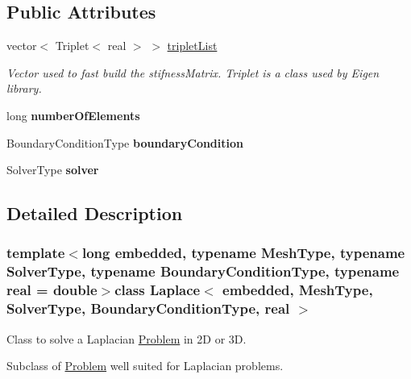 \subsection*{\-Public \-Attributes}
\begin{DoxyCompactItemize}
\item 
\hypertarget{class_laplace_a3c7f5f7a6eaca88b6cbfee3afdfe4c07}{vector$<$ \-Triplet$<$ real $>$ $>$ \hyperlink{class_laplace_a3c7f5f7a6eaca88b6cbfee3afdfe4c07}{triplet\-List}}\label{class_laplace_a3c7f5f7a6eaca88b6cbfee3afdfe4c07}

\begin{DoxyCompactList}\small\item\em \-Vector used to fast build the stifness\-Matrix. \-Triplet is a class used by \-Eigen library. \end{DoxyCompactList}\item 
\hypertarget{class_laplace_a0654b60f9552d97136a11ea7836e219b}{long {\bfseries number\-Of\-Elements}}\label{class_laplace_a0654b60f9552d97136a11ea7836e219b}

\item 
\hypertarget{class_laplace_a5e83c7cde7aa4051caf619d41b9642c0}{\-Boundary\-Condition\-Type {\bfseries boundary\-Condition}}\label{class_laplace_a5e83c7cde7aa4051caf619d41b9642c0}

\item 
\hypertarget{class_laplace_a288665cbc9433c15e61dbf08b04654a3}{\-Solver\-Type {\bfseries solver}}\label{class_laplace_a288665cbc9433c15e61dbf08b04654a3}

\end{DoxyCompactItemize}


\subsection{\-Detailed \-Description}
\subsubsection*{template$<$long embedded, typename Mesh\-Type, typename Solver\-Type, typename Boundary\-Condition\-Type, typename real = double$>$class Laplace$<$ embedded, Mesh\-Type, Solver\-Type, Boundary\-Condition\-Type, real $>$}

\-Class to solve a \-Laplacian \hyperlink{class_problem}{\-Problem} in 2\-D or 3\-D. 

\-Subclass of \hyperlink{class_problem}{\-Problem} well suited for \-Laplacian problems.

